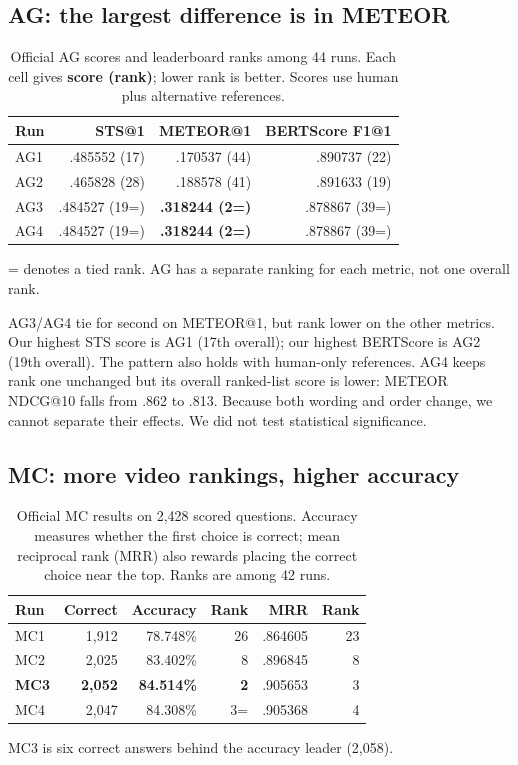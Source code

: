 \documentclass[11pt,letterpaper]{article}
\begin{document}
\subsection{AG: the largest difference is in METEOR}
\begin{table}[H]\centering\small
\caption{Official AG scores and leaderboard ranks among 44 runs. Each cell gives \textbf{score (rank)}; lower rank is better. Scores use human plus alternative references.}\label{fig:agresults}
\begin{tabular}{lrrr}\toprule
Run & STS@1 & METEOR@1 & BERTScore F1@1\\\midrule
AG1 & .485552 (17) & .170537 (44) & .890737 (22)\\
AG2 & .465828 (28) & .188578 (41) & .891633 (19)\\
AG3 & .484527 (19=) & \textbf{.318244 (2=)} & .878867 (39=)\\
AG4 & .484527 (19=) & \textbf{.318244 (2=)} & .878867 (39=)\\\bottomrule
\end{tabular}
\end{table}
{\small = denotes a tied rank. AG has a separate ranking for each metric, not one overall rank.}

AG3/AG4 tie for second on METEOR@1, but rank lower on the other metrics. Our highest STS score is AG1 (17th overall); our highest BERTScore is AG2 (19th overall). The pattern also holds with human-only references. AG4 keeps rank one unchanged but its overall ranked-list score is lower: METEOR NDCG@10 falls from .862 to .813. Because both wording and order change, we cannot separate their effects. We did not test statistical significance.

\subsection{MC: more video rankings, higher accuracy}
\begin{table}[H]\centering\small
\caption{Official MC results on 2,428 scored questions. Accuracy measures whether the first choice is correct; mean reciprocal rank (MRR) also rewards placing the correct choice near the top. Ranks are among 42 runs.}\label{fig:mcresults}
\begin{tabular}{lrrrrr}\toprule
Run & Correct & Accuracy & Rank & MRR & Rank\\\midrule
MC1 & 1,912 & 78.748\% & 26 & .864605 & 23\\
MC2 & 2,025 & 83.402\% & 8 & .896845 & 8\\
\textbf{MC3} & \textbf{2,052} & \textbf{84.514\%} & \textbf{2} & .905653 & 3\\
MC4 & 2,047 & 84.308\% & 3= & .905368 & 4\\\bottomrule
\end{tabular}
\end{table}
MC3 is six correct answers behind the accuracy leader (2,058).
\end{document}
